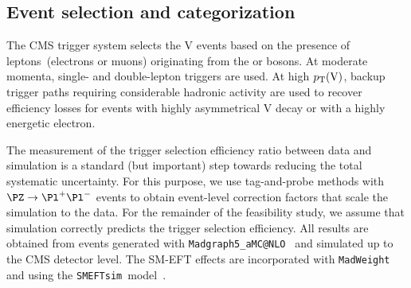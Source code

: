 \documentclass[a4paper,11pt]{article}
\newcommand{\Pb}{{{\Pqb}}\xspace}
\newcommand{\PAb}{{{{\Paqb}}}\xspace}
\renewcommand{\PV}{{{{V}}}\xspace}
\newcommand{\VH}{{{\PV}{\PH}}\xspace}
\begin{document}

\subsection{Event selection and categorization}

The CMS trigger system selects the \VH events based on the presence of leptons~(electrons or muons) originating from the \PW or \PZ bosons. 
At moderate momenta, single- and double-lepton triggers are used.
At high $\pt\textrm{(\PV)}$, backup trigger paths requiring considerable hadronic activity are used to recover
efficiency losses for events with highly asymmetrical \PV decay or with a highly energetic electron. 

The measurement of the trigger selection efficiency ratio between data and simulation is a standard (but important) step towards reducing the total systematic uncertainty.
For this purpose, we use tag-and-probe methods with $\PZ \rightarrow {\Pl}^{+} {\Pl}^{-}$ events to obtain event-level correction factors that scale the simulation to the data. 
For the remainder of the feasibility study, we assume that simulation correctly predicts the trigger selection efficiency. 
All results are obtained from events generated with \texttt{Madgraph5\_aMC@NLO}~\cite{Alwall:2014hca} and simulated up to the CMS detector level. 
The SM-EFT effects are incorporated with \texttt{MadWeight}~\cite{Artoisenet:2008zz} and using the \texttt{SMEFTsim}~model~\cite{Brivio:2017btx}.
\end{document}
